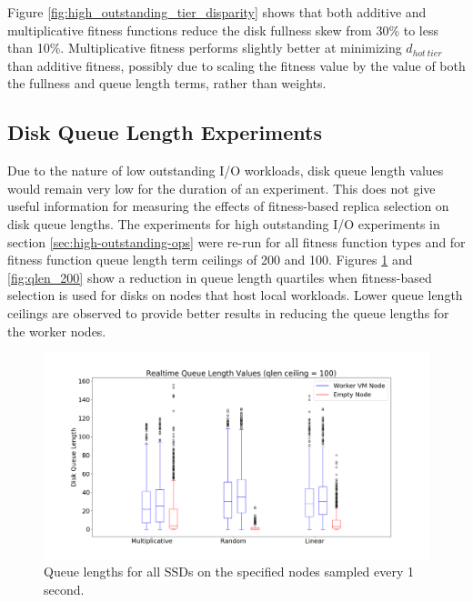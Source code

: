 \documentclass[12pt]{article}
\begin{document}
    Figure \ref{fig:high_outstanding_tier_disparity} shows that both additive
    and multiplicative fitness functions reduce the disk fullness skew from
    30\% to less than 10\%. Multiplicative fitness performs slightly better at
    minimizing $d_{hot\ tier}$ than additive fitness, possibly due to scaling
    the fitness value by the value of both the fullness and queue length terms,
    rather than weights.
  
  \subsection{Disk Queue Length Experiments} \label{experiments-qlen}

  Due to the nature of low outstanding I/O workloads, disk queue length values
  would remain very low for the duration of an experiment. This does not give
  useful information for measuring the effects of fitness-based replica
  selection on disk queue lengths. The experiments for high outstanding I/O
  experiments in section \ref{sec:high-outstanding-ops} were re-run for all
  fitness function types and for fitness function queue length term ceilings of
  200 and 100. Figures \ref{fig:qlen_100} and \ref{fig:qlen_200} show a
  reduction in queue length quartiles when fitness-based selection is used for
  disks on nodes that host local workloads. Lower queue length ceilings are
  observed to provide better results in reducing the queue lengths for the
  worker nodes.

  \begin{figure}[!htb]
    \centering
    \includegraphics[scale=0.32]{images/qlen_100_box.png} 
    \caption{Queue lengths for all SSDs on the specified nodes sampled every 1
             second.}
    \label{fig:qlen_100}
  \end{figure}
\end{document}
